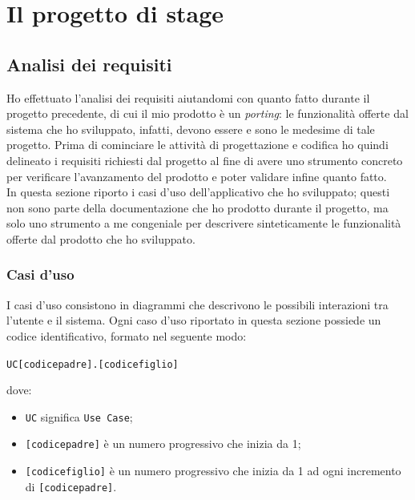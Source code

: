 
\chapter{Il progetto di stage}
\label{cap:progetto-stage}

\section{Analisi dei requisiti}

Ho effettuato l'analisi dei requisiti aiutandomi con quanto fatto durante il progetto precedente, di cui il mio prodotto è un \textit{porting}: le funzionalità offerte dal sistema che ho sviluppato, infatti, devono essere e sono le medesime di tale progetto. Prima di cominciare le attività di progettazione e codifica ho quindi delineato i requisiti richiesti dal progetto al fine di avere uno strumento concreto per verificare l'avanzamento del prodotto e poter validare infine quanto fatto. \\
In questa sezione riporto i casi d'uso dell'applicativo che ho sviluppato; questi non sono parte della documentazione che ho prodotto durante il progetto, ma solo uno strumento a me congeniale per descrivere sinteticamente le funzionalità offerte dal prodotto che ho sviluppato.

\subsection{Casi d'uso}

I casi d'uso consistono in diagrammi che descrivono le possibili interazioni tra l'utente e il sistema. Ogni caso d'uso riportato in questa sezione possiede un codice identificativo, formato nel seguente modo:
\begin{center}
  \centering
  \texttt{UC[codicepadre].[codicefiglio]}
\end{center} dove:
\begin{itemize}
  \item \texttt{UC} significa \texttt{Use Case};
  \item \texttt{[codicepadre]} è un numero progressivo che inizia da 1;
  \item \texttt{[codicefiglio]} è un numero progressivo che inizia da 1 ad ogni incremento di \texttt{[codicepadre]}.
\end{itemize}

